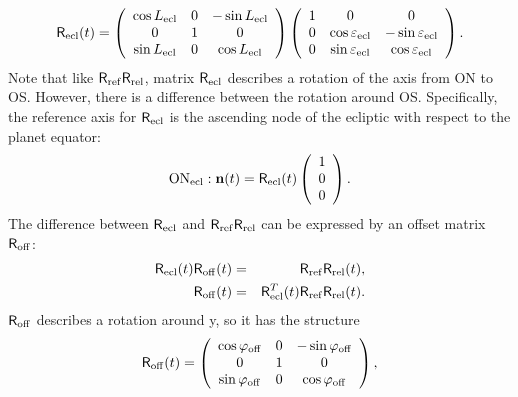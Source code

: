 \documentclass[Orbiter Technical Reference.tex]{subfiles}
\begin{document}
\begin{equation}\label{eq:rot_ecl}
\mathsf{R}_\mathrm{ecl}(t) = \left( \begin{array}{ccc}
\cos L_\mathrm{ecl} & 0 & -\sin L_\mathrm{ecl} \\
0 & 1 & 0 \\
\sin L_\mathrm{ecl} & 0 & \cos L_\mathrm{ecl} \end{array} \right)
\left( \begin{array}{ccc}
1 & 0 & 0 \\
0 & \cos\varepsilon_\mathrm{ecl} & -\sin\varepsilon_\mathrm{ecl} \\
0  & \sin\varepsilon_\mathrm{ecl} & \cos\varepsilon_\mathrm{ecl}
\end{array} \right).
\end{equation}
Note that like $\mathsf{R}_\mathrm{ref} \mathsf{R}_\mathrm{rel}$, matrix $\mathsf{R}_\mathrm{ecl}$ describes a rotation of the axis from ON to OS. However, there is a difference between the rotation around OS. Specifically, the reference axis for $\mathsf{R}_\mathrm{ecl}$ is the ascending node of the ecliptic with respect to the planet equator:
\begin{equation}
\mathrm{ON}_\mathrm{ecl}: \mathbf{n}(t) = \mathsf{R}_\mathrm{ecl}(t)
\left( \begin{array}{c} 1 \\ 0 \\ 0 \end{array} \right).
\end{equation}
The difference between $\mathsf{R}_\mathrm{ecl}$ and $\mathsf{R}_\mathrm{ref} \mathsf{R}_\mathrm{rel}$ can be expressed by an offset matrix $\mathsf{R}_\mathrm{off}$:
\begin{eqnarray}
\mathsf{R}_\mathrm{ecl}(t) \mathsf{R}_\mathrm{off}(t) &=& \mathsf{R}_\mathrm{ref} \mathsf{R}_\mathrm{rel}(t),\\
\mathsf{R}_\mathrm{off}(t) &=& \mathsf{R}^T_\mathrm{ecl}(t) \mathsf{R}_\mathrm{ref} \mathsf{R}_\mathrm{rel}(t).
\end{eqnarray}
$\mathsf{R}_\mathrm{off}$ describes a rotation around y, so it has the structure
\begin{equation}
\mathsf{R}_\mathrm{off}(t) = \left( \begin{array}{ccc}
\cos \varphi_\mathrm{off} & 0 & -\sin \varphi_\mathrm{off} \\
0 & 1 & 0 \\
\sin \varphi_\mathrm{off} & 0 & \cos \varphi_\mathrm{off} \end{array} \right),
\end{equation}
\end{document}
